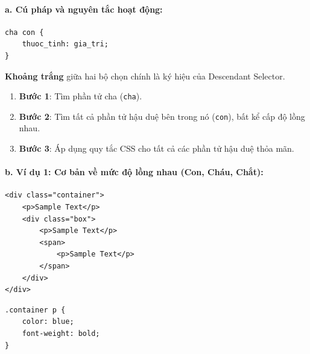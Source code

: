 \documentclass[11pt,oneside]{book}
\newcommand{\codeinline}[1]{\textcolor{accentOrange}{\texttt{#1}}}
\begin{document}
\paragraph{a. Cú pháp và nguyên tắc hoạt động:}
\begin{codeWindow}
\begin{lstlisting}[language=CSS3]
cha con {
    thuoc_tinh: gia_tri;
}
\end{lstlisting}
\end{codeWindow}

\begin{noteBox}
\textbf{Khoảng trắng} giữa hai bộ chọn chính là ký hiệu của Descendant Selector.
\begin{enumerate}[leftmargin=1.5em, itemsep=2pt, parsep=0pt]
    \item \textbf{Bước 1}: Tìm phần tử cha (\codeinline{cha}).
    \item \textbf{Bước 2}: Tìm tất cả phần tử hậu duệ bên trong nó (\codeinline{con}), bất kể cấp độ lồng nhau.
    \item \textbf{Bước 3}: Áp dụng quy tắc CSS cho tất cả các phần tử hậu duệ thỏa mãn.
\end{enumerate}
\end{noteBox}

\paragraph{b. Ví dụ 1: Cơ bản về mức độ lồng nhau (Con, Cháu, Chắt):}
\begin{codeWindow}
\begin{lstlisting}[language=HTML5]
<div class="container">
    <p>Sample Text</p>
    <div class="box">
        <p>Sample Text</p>
        <span>
            <p>Sample Text</p>
        </span>
    </div>
</div>
\end{lstlisting}

\begin{lstlisting}[language=CSS3]
.container p {
    color: blue;
    font-weight: bold;
}
\end{lstlisting}
\end{codeWindow}
\end{document}
